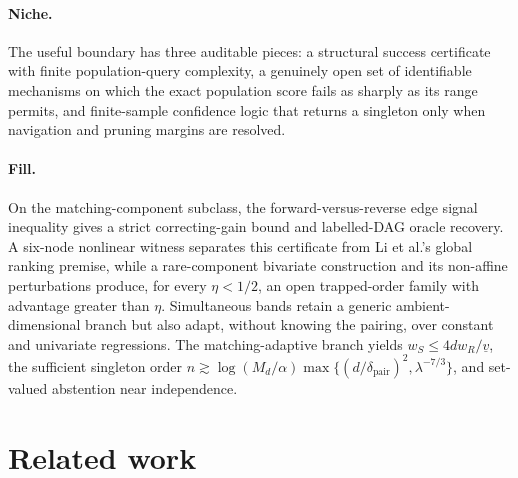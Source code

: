 \documentclass{article}
\begin{document}
\paragraph{Niche.} The useful boundary has three auditable pieces: a structural success certificate with finite population-query complexity, a genuinely open set of identifiable mechanisms on which the exact population score fails as sharply as its range permits, and finite-sample confidence logic that returns a singleton only when navigation and pruning margins are resolved.

\paragraph{Fill.} On the matching-component subclass, the forward-versus-reverse edge signal inequality gives a strict correcting-gain bound and labelled-DAG oracle recovery. A six-node nonlinear witness separates this certificate from Li et al.'s global ranking premise, while a rare-component bivariate construction and its non-affine perturbations produce, for every \(\eta<1/2\), an open trapped-order family with advantage greater than \(\eta\). Simultaneous bands retain a generic ambient-dimensional branch but also adapt, without knowing the pairing, over constant and univariate regressions. The matching-adaptive branch yields \(w_S\le4d w_R/\underline v\), the sufficient singleton order \(n\gtrsim\log(M_d/\alpha)\max\{(d/\delta_{\mathrm{pair}})^2,\lambda^{-7/3}\}\), and set-valued abstention near independence.

\section{Related work}
\end{document}
